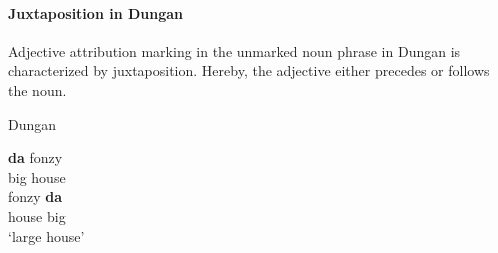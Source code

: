 \paragraph*{Juxtaposition in Dungan}
Adjective attribution marking in the unmarked noun phrase in Dungan is characterized by juxtaposition. Hereby, the adjective either precedes or follows the noun.
\begin{exe}
\ex \rm{Dungan \citep[480]{kalimov1968}}
\label{dungan juxtap}
\begin{xlist}
\ex 	
\gll	\textbf{da} fonzy\\
	big house\\
\ex
\gll	fonzy \textbf{da}\\
	house big\\
\glt	‘large house’
\end{xlist}
\end{exe}

